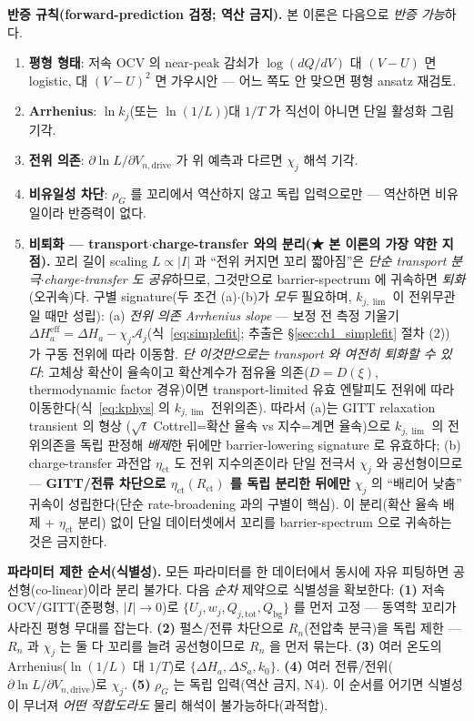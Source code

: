 \documentclass[11pt,a4paper]{article}
\newcommand{\eff}{\mathrm{eff}}
\newcommand{\drive}{\mathrm{drive}}
\newcommand{\bg}{\mathrm{bg}}
\newcommand{\tot}{\mathrm{tot}}
\begin{document}
\textbf{반증 규칙(forward-prediction 검정; 역산 금지).} 본 이론은 다음으로 \emph{반증 가능}하다.
\begin{enumerate}[label=(N\arabic*),leftmargin=2.4em]
\item \textbf{평형 형태}: 저속 OCV 의 near-peak 감쇠가 $\log(dQ/dV)$ 대 $(V-U)$ 면 logistic, 대 $(V-U)^2$
  면 가우시안 — 어느 쪽도 안 맞으면 평형 ansatz 재검토.
\item \textbf{Arrhenius}: $\ln k_j$(또는 $\ln(1/L)$)대 $1/T$ 가 직선이 아니면 단일 활성화 그림 기각.
\item \textbf{전위 의존}: $\partial\ln L/\partial V_{n,\drive}$ 가 위 예측과 다르면 $\chi_j$ 해석 기각.
\item \textbf{비유일성 차단}: $\rho_G$ 를 꼬리에서 역산하지 않고 독립 입력으로만 — 역산하면 비유일이라
  반증력이 없다.
\item \textbf{비퇴화 — transport$\cdot$charge-transfer 와의 분리(★ 본 이론의 가장 약한 지점).} 꼬리 길이 scaling
  $L\propto|I|$ 과 ``전위 커지면 꼬리 짧아짐''은 \emph{단순 transport 분극$\cdot$charge-transfer 도 공유}하므로,
  그것만으로 barrier-spectrum 에 귀속하면 \emph{퇴화}(오귀속)다. 구별 signature(두 조건 (a)$\cdot$(b)가 \emph{모두}
  필요하며, $k_{j,\lim}$ 이 전위무관일 때만 성립): (a) \emph{전위 의존 Arrhenius slope} — 보정 전 측정 기울기
  $\Delta H_a^{\eff}=\Delta H_a-\chi_j\mathcal A_j$(식~\eqref{eq:simplefit}; 추출은 \S\ref{sec:ch1_simplefit} 절차 (2))
  가 구동 전위에 따라 이동함. \emph{단 이것만으로는 transport 와 여전히 퇴화할 수 있다}: 고체상 확산이 율속이고
  확산계수가 점유율 의존($D=D(\xi)$, thermodynamic factor 경유)이면 transport-limited 유효 엔탈피도 전위에 따라
  이동한다(식~\eqref{eq:kphys} 의 $k_{j,\lim}$ 전위의존). 따라서 (a)는 GITT relaxation transient 의 형상
  ($\sqrt t$ Cottrell=확산 율속 vs 지수=계면 율속)으로 $k_{j,\lim}$ 의 전위의존을 독립 판정해 \emph{배제}한 뒤에만
  barrier-lowering signature 로 유효하다; (b) charge-transfer 과전압 $\eta_{\mathrm{ct}}$ 도 전위 지수의존이라 단일
  전극서 $\chi_j$ 와 공선형이므로 — \textbf{GITT/전류 차단으로 $\eta_{\mathrm{ct}}(R_{\mathrm{ct}})$ 를 독립 분리한
  뒤에만} $\chi_j$ 의 ``배리어 낮춤'' 귀속이 성립한다(단순 rate-broadening \cite{dubarry2022,fly2020} 과의 구별이
  핵심). 이 분리(확산 율속 배제 + $\eta_{\mathrm{ct}}$ 분리) 없이 단일 데이터셋에서 꼬리를 barrier-spectrum 으로
  귀속하는 것은 금지한다.
\end{enumerate}
\textbf{파라미터 제한 순서(식별성).} 모든 파라미터를 한 데이터에서 동시에 자유 피팅하면 공선형(co-linear)이라
분리 불가다. 다음 \emph{순차} 제약으로 식별성을 확보한다: \textbf{(1)} 저속 OCV/GITT(준평형, $|I|\to0$)로
$\{U_j,w_j,Q_{j,\tot},Q_\bg\}$ 를 먼저 고정 — 동역학 꼬리가 사라진 평형 무대를 잡는다. \textbf{(2)} 펄스/전류
차단으로 $R_n$(전압축 분극)을 독립 제한 — $R_n$ 과 $\chi_j$ 는 둘 다 꼬리를 늘려 공선형이므로 $R_n$ 을 먼저
묶는다. \textbf{(3)} 여러 온도의 Arrhenius($\ln(1/L)$ 대 $1/T$)로 $\{\Delta H_a,\Delta S_a,k_0\}$. \textbf{(4)}
여러 전류/전위($\partial\ln L/\partial V_{n,\drive}$)로 $\chi_j$. \textbf{(5)} $\rho_G$ 는 독립 입력(역산 금지,
N4). 이 순서를 어기면 식별성이 무너져 \emph{어떤 적합도라도} 물리 해석이 불가능하다(과적합).
\end{document}
